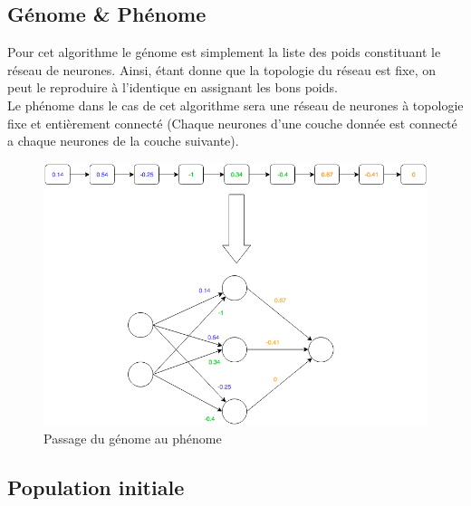 \documentclass{article}
\begin{document}
\subsection{Génome \& Phénome}

Pour cet algorithme le génome est simplement la liste des poids constituant le réseau de neurones. Ainsi, étant donne que la topologie du réseau est fixe, on peut le reproduire à l'identique en assignant les bons poids.\\

Le phénome dans le cas de cet algorithme sera une réseau de neurones à topologie fixe et entièrement connecté (Chaque neurones d'une couche donnée est connecté a chaque neurones de la couche suivante).

\begin{figure}[h]
\begin{center}
	\includegraphics[scale=0.5]{genomephenome.png}
	\caption{Passage du génome au phénome}
\end{center}
\end{figure}

\subsection{Population initiale}
\end{document}
